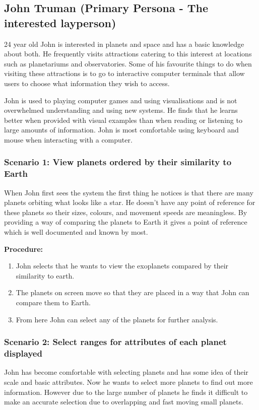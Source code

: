 \subsection{John Truman (Primary Persona - The interested layperson)}
24 year old John is interested in planets and space and has a basic knowledge
about both. He frequently visits attractions catering to this interest at
locations such as planetariums and observatories. Some of his favourite things
to do when visiting these attractions is to go to interactive computer terminals
that
allow users to choose what information they wish to access.

John is used to playing computer games and using visualisations and is not
overwhelmed understanding and using new systems. He finds that he learns better
when provided with visual examples than when reading or listening to large
amounts of
information. John is most comfortable using keyboard and mouse when interacting
with a computer.

\subsubsection{Scenario 1: View planets ordered by their similarity to Earth}
 When John first sees the system the first thing he notices is that there are
many planets orbiting what looks like a star. He doesn't have any point of
reference for these planets so their sizes, colours, and movement speeds are
meaningless. By providing a way of comparing the planets to Earth it gives a
point of reference which is well documented and known by most.
 
 {\bf Procedure:}
 \begin{enumerate}
 \item John selects that he wants to view the exoplanets compared by their
similarity to earth.
 \item The planets on screen move so that they are placed in a way that John can
compare them to Earth.
 \item From here John can select any of the planets for further analysis.
 \end{enumerate}

  \subsubsection{Scenario 2: Select ranges for attributes of each planet
displayed}
 John has become comfortable with selecting planets and has some idea of their
scale and basic attributes. Now he wants to select more planets
to find out more information. However due to the large number of planets he
finds it difficult to make an accurate selection due to overlapping and fast
moving
small planets.
 
